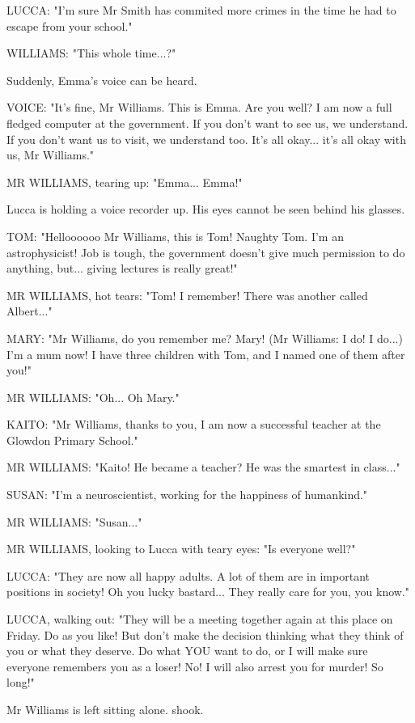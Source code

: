 \documentclass[11pt]{article}
\begin{document}
LUCCA: "I'm sure Mr Smith has commited more crimes in the time he had to escape from your school."

WILLIAMS: "This whole time...?"

Suddenly, Emma's voice can be heard. 

VOICE: "It's fine, Mr Williams. 
This is Emma.
Are you well? 
I am now a full fledged computer at the government.
If you don't want to see us, we understand. 
If you don't want us to visit, we understand too.
It's all okay... it's all okay with us, Mr Williams."

MR WILLIAMS, tearing up: "Emma... Emma!"

Lucca is holding a voice recorder up.
His eyes cannot be seen behind his glasses.

TOM: "Helloooooo Mr Williams, this is Tom! 
Naughty Tom.
I'm an astrophysicist! 
Job is tough, the government doesn't give much permission to do anything, but... giving lectures is really great!"

MR WILLIAMS, hot tears: "Tom! I remember! There was another called Albert..."

MARY: "Mr Williams, do you remember me? Mary! (Mr Williams: I do! I do...) 
I'm a mum now! I have three children with Tom, and I named one of them after you!"

MR WILLIAMS: "Oh... Oh Mary."

KAITO: "Mr Williams, thanks to you, I am now a successful teacher at the Glowdon Primary School."

MR WILLIAMS: "Kaito! He became a teacher? 
He was the smartest in class..."

SUSAN: "I'm a neuroscientist, working for the happiness of humankind."

MR WILLIAMS: "Susan..."

MR WILLIAMS, looking to Lucca with teary eyes: "Is everyone well?"

LUCCA: "They are now all happy adults. A lot of them are in important positions in society!
Oh you lucky bastard... They really care for you, you know."

LUCCA, walking out: "They will be a meeting together again at this place on Friday.
Do as you like!
But don't make the decision thinking what they think of you or what they deserve.
Do what YOU want to do, or I will make sure everyone remembers you as a loser!
No! I will also arrest you for murder!
So long!"

Mr Williams is left sitting alone. shook.

\ 
\end{document}
